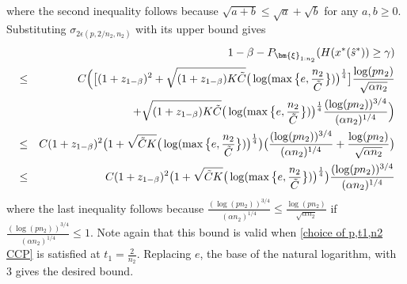 \documentclass[mnsc,blindrev]{informs4} %
\begin{document}
where the second inequality follows because $\sqrt{a+b}\leq \sqrt{a}+\sqrt{b}$ for any $a,b\geq 0$. Substituting $\sigma_{2\epsilon(p,2/n_2,n_2)}$ with its upper bound gives
\begin{eqnarray*}
&&1-\beta-P_{\bm{\xi}_{1:n_2}}(H(x^*(\hat s^*))\geq \gamma)\\
&\leq&C\Big(\big[(1+z_{1-\beta})^2+\sqrt{(1+z_{1-\beta})K\tilde C}\big(\log(\max\big\{e,\frac{n_2}{\tilde C}\big\})\big)^{\frac{1}{4}}\big]\frac{\log(pn_2)}{\sqrt{\alpha n_2}}\\
&&\hspace{5ex}+\sqrt{(1+z_{1-\beta})K\tilde C}\big(\log(\max\big\{e,\frac{n_2}{\tilde C}\big\})\big)^{\frac{1}{4}}\frac{(\log(pn_2))^{3/4}}{(\alpha n_2)^{1/4}}\Big)\\
&\leq&C(1+z_{1-\beta})^2\big(1+\sqrt{\tilde C K}\big(\log(\max\big\{e,\frac{n_2}{\tilde C}\big\})\big)^{\frac{1}{4}}\big)\big(\frac{(\log(pn_2))^{3/4}}{(\alpha n_2)^{1/4}}+\frac{\log(pn_2)}{\sqrt{\alpha n_2}}\big)\\
&\leq&C(1+z_{1-\beta})^2\big(1+\sqrt{\tilde C K}\big(\log(\max\big\{e,\frac{n_2}{\tilde C}\big\})\big)^{\frac{1}{4}}\big)\frac{(\log(pn_2))^{3/4}}{(\alpha n_2)^{1/4}}
\end{eqnarray*}
where the last inequality follows because $\frac{(\log(pn_2))^{3/4}}{(\alpha n_2)^{1/4}}\leq \frac{\log(pn_2)}{\sqrt{\alpha n_2}}$ if $\frac{(\log(pn_2))^{3/4}}{(\alpha n_2)^{1/4}}\leq 1$. Note again that this bound is valid when \eqref{choice of p,t1,n2 CCP} is satisfied at $t_1=\frac{2}{n_2}$. Replacing $e$, the base of the natural logarithm, with $3$ gives the desired bound.\hfill\Halmos
\end{document}
